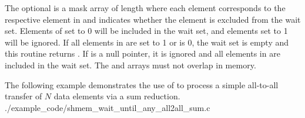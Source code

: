 \begin{apidefinition}
{    The optional  is a mask array of length  where each
    element corresponds to the respective element in  and indicates
    whether the element is excluded from the wait set.  Elements of
     set to 0 will be included in the wait set, and elements set to
    1 will be ignored.  If all elements in  are set to 1 or
     is 0, the wait set is empty and this routine returns
    .  If
     is a null pointer, it is ignored and all elements in
     are included in the wait set.  The  and 
    arrays must not overlap in memory.
}





\begin{apiexamples}
  \apicexample
      {The following \Cstd[11] example demonstrates the use of
       to process a simple all-to-all transfer
      of $N$ data elements via a sum reduction.}
      {./example_code/shmem_wait_until_any_all2all_sum.c}
      {}

\end{apiexamples}

\end{apidefinition}


